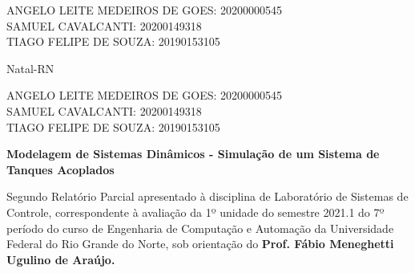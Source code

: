 \documentclass[a4paper,12pt]{article}
\newcommand{\cityandyear}{
\large Natal-RN\\
 \the\year 
 }
\begin{document}
\begin{center}
\vspace{3.0cm}



\begin{flushright}
    \begin{normalsize}
        ANGELO LEITE MEDEIROS DE GOES: 20200000545\\
        \vspace{0.6cm}
        SAMUEL CAVALCANTI: 20200149318\\
        \vspace{0.6cm}
        TIAGO FELIPE DE SOUZA: 20190153105\\
    \end{normalsize}
\end{flushright}


\vspace{3.7cm}

\cityandyear

\end{center}

\newpage


\thispagestyle{empty}

\begin{center}
\begin{normalsize}
ANGELO LEITE MEDEIROS DE GOES: 20200000545\\
\vspace{0.6cm}
SAMUEL CAVALCANTI: 20200149318\\
\vspace{0.6cm}
TIAGO FELIPE DE SOUZA: 20190153105\\
\end{normalsize}
\end{center}
\vspace{4.2cm}

{\bf{\large {\centering Modelagem de Sistemas Dinâmicos - Simulação de um Sistema de Tanques Acoplados\\}}}

\vspace{4cm}

\begin{adjustwidth}{7.5cm}{0cm}

{\normalsize

Segundo Relatório Parcial apresentado à disciplina de
Laboratório de Sistemas de Controle, correspondente à
avaliação da 1º unidade do semestre 2021.1 do 7º período
do curso de Engenharia de Computação e Automação da
Universidade Federal do Rio Grande do Norte, sob
orientação do {\bf Prof. Fábio Meneghetti Ugulino de
Araújo.}

}

\end{adjustwidth}
\end{document}
